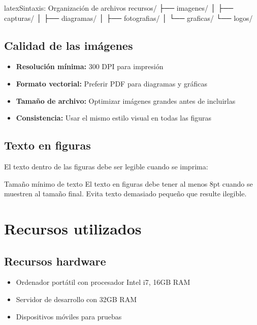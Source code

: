 \begin{codigosimple}{latex}{Sintaxis: Organización de archivos}
recursos/
├── imagenes/
│   ├── capturas/       %
│   ├── diagramas/      %
│   ├── fotografias/    %
│   └── graficas/       %
└── logos/              %
\end{codigosimple}

\subsection{Calidad de las imágenes}
\label{subsec:calidad-imagenes}

\begin{itemize}
  \item \textbf{Resolución mínima:} 300 DPI para impresión
  \item \textbf{Formato vectorial:} Preferir PDF para diagramas y gráficas
  \item \textbf{Tamaño de archivo:} Optimizar imágenes grandes antes de incluirlas
  \item \textbf{Consistencia:} Usar el mismo estilo visual en todas las figuras
\end{itemize}

\subsection{Texto en figuras}
\label{subsec:texto-figuras}

El texto dentro de las figuras debe ser legible cuando se imprima:

\begin{warningbox}{Tamaño mínimo de texto}
El texto en figuras debe tener al menos 8pt cuando se muestren al tamaño final. Evita texto demasiado pequeño que resulte ilegible.
\end{warningbox}

\section{Recursos utilizados}
\label{sec:recursos-utilizados}

\subsection{Recursos hardware}
\label{subsec:recursos-hardware}

\begin{itemize}
  \item Ordenador portátil con procesador Intel i7, 16GB RAM
  \item Servidor de desarrollo con 32GB RAM
  \item Dispositivos móviles para pruebas
\end{itemize}

